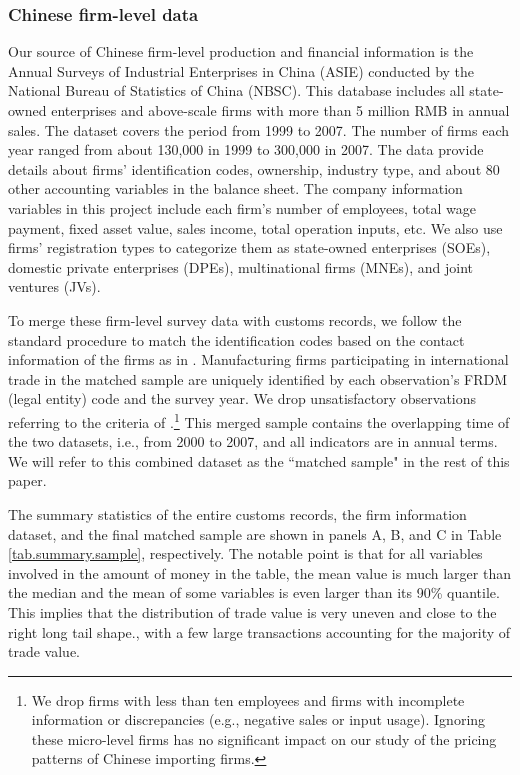 \documentclass[12pt]{article}
\begin{document}
\subsubsection{Chinese firm-level data} \label{Data-CIE}

Our source of Chinese firm-level production and financial information is the Annual Surveys of Industrial Enterprises in China (ASIE) conducted by the National Bureau of Statistics of China (NBSC). This database includes all state-owned enterprises and above-scale firms with more than 5 million RMB in annual sales. The dataset covers the period from 1999 to 2007. The number of firms each year ranged from about 130,000 in 1999 to 300,000 in 2007. The data provide details about firms’ identification codes, ownership, industry type, and about 80 other accounting variables in the balance sheet. The company information variables in this project include each firm's number of employees, total wage payment, fixed asset value, sales income, total operation inputs, etc. We also use firms’ registration types to categorize them as state-owned enterprises (SOEs), domestic private enterprises (DPEs), multinational firms (MNEs), and joint ventures (JVs).

To merge these firm-level survey data with customs records, we follow the standard procedure to match the identification codes based on the contact information of the firms as in \cite{fan-li-yeaple2015}. Manufacturing firms participating in international trade in the matched sample are uniquely identified by each observation's FRDM (legal entity) code and the survey year. We drop unsatisfactory observations referring to the criteria of \cite{bkl2021}.\footnote{We drop firms with less than ten employees and firms with incomplete information or discrepancies (e.g., negative sales or input usage). Ignoring these micro-level firms has no significant impact on our study of the pricing patterns of Chinese importing firms.} This merged sample contains the overlapping time of the two datasets, i.e., from 2000 to 2007, and all indicators are in annual terms. We will refer to this combined dataset as the ``matched sample" in the rest of this paper.

The summary statistics of the entire customs records, the firm information dataset, and the final matched sample are shown in panels A, B, and C in Table \ref{tab.summary.sample}, respectively. The notable point is that for all variables involved in the amount of money in the table, the mean value is much larger than the median and the mean of some variables is even larger than its 90\% quantile. This implies that the distribution of trade value is very uneven and close to the right long tail shape., with a few large transactions accounting for the majority of trade value.
\end{document}
